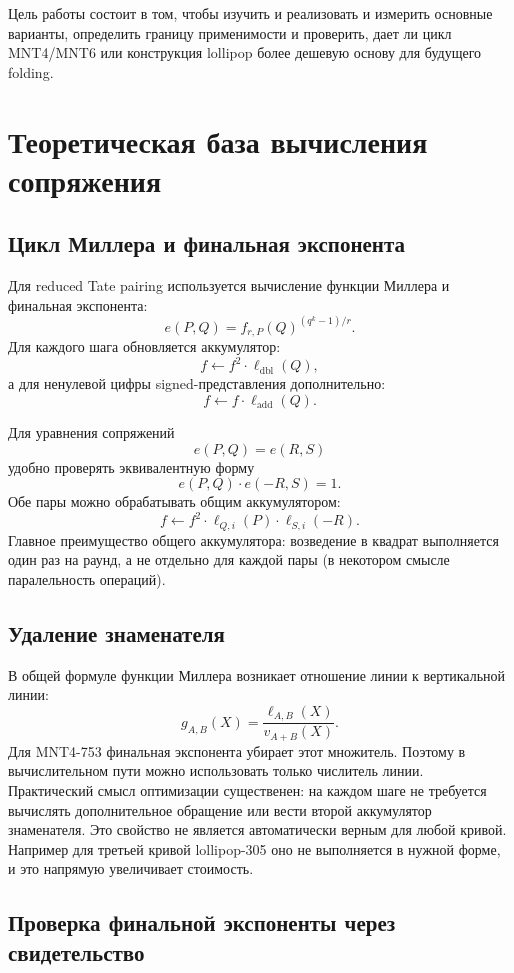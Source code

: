 \documentclass[12pt,a4paper]{article}
\begin{document}
Цель работы состоит в том, чтобы изучить и реализовать и измерить основные варианты, определить границу применимости и проверить, дает ли цикл MNT4/MNT6 или конструкция lollipop более дешевую основу для будущего folding.

\section{Теоретическая база вычисления сопряжения}

\subsection{Цикл Миллера и финальная экспонента}

Для reduced Tate pairing используется вычисление функции Миллера и финальная
экспонента:
\[
    e(P,Q)=f_{r,P}(Q)^{(q^k-1)/r}.
\]
Для каждого шага обновляется аккумулятор:
\[
    f \leftarrow f^2\cdot \ell_{\mathrm{dbl}}(Q),
\]
а для ненулевой цифры signed-представления дополнительно:
\[
    f \leftarrow f\cdot \ell_{\mathrm{add}}(Q).
\]

Для уравнения сопряжений
\[
    e(P,Q)=e(R,S)
\]
удобно проверять эквивалентную форму
\[
    e(P,Q)\cdot e(-R,S)=1.
\]
Обе пары можно обрабатывать общим аккумулятором:
\[
    f \leftarrow
    f^2\cdot \ell_{Q,i}(P)\cdot \ell_{S,i}(-R).
\]
Главное преимущество общего аккумулятора: возведение в квадрат выполняется
один раз на раунд, а не отдельно для каждой пары (в некотором смысле паралельность операций).

\subsection{Удаление знаменателя}

В общей формуле функции Миллера возникает отношение линии к вертикальной
линии:
\[
    g_{A,B}(X)=\frac{\ell_{A,B}(X)}{v_{A+B}(X)}.
\]
Для MNT4-753 финальная экспонента убирает этот множитель. Поэтому в вычислительном пути
можно использовать только числитель линии. Практический смысл оптимизации существенен: на каждом шаге не требуется вычислять дополнительное обращение или вести второй аккумулятор знаменателя.
Это свойство не является автоматически верным для любой кривой. Например для третьей кривой lollipop-305 оно не выполняется в нужной форме, и это напрямую увеличивает стоимость.


\subsection{Проверка финальной экспоненты через свидетельство}
\end{document}

